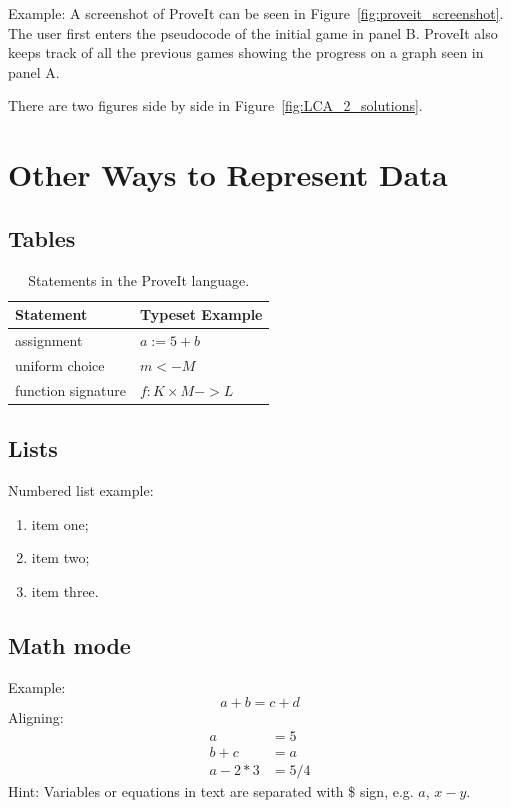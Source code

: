 \documentclass[estonian,english]{unitartucs-thesis} %
\newcommand{\proveit}{ProveIt\xspace}
\begin{document}
Example: A screenshot of \proveit can be seen in Figure~\ref{fig:proveit_screenshot}. The user first enters the pseudocode of the initial game in panel B. \proveit also keeps track of all the previous games showing the progress on a graph seen in panel A.

There are two figures side by side in Figure~\ref{fig:LCA_2_solutions}.



\clearpage %
\section{Other Ways to Represent Data}

\subsection{Tables}

\begin{table}[h]
\centering
\caption{Statements in the \proveit language.}
\begin{tabular}{| l | l |}
	\hline
	\bf{Statement} & \bf{Typeset Example} \\
	\hline
	assignment & $a := 5 + b$ \\
	\hline
	uniform choice & $m <- M$ \\
	\hline
	function signature & $f : K \times M -> L$\\
	\hline
\end{tabular}
\label{tab:statements}
\end{table}


\subsection{Lists}

Numbered list example:
\begin{enumerate}
	\item item one;
	\item item two;
	\item item three.
\end{enumerate}

\subsection{Math mode}
Example:
\begin{equation}
a + b = c + d
\end{equation}
Aligning:
\begin{align*}
	a &= 5 \\
	b + c &= a \\
	a -2*3 &= 5/4
\end{align*}
Hint: Variables or equations in text are separated with \$ sign, e.g. $a$, $x - y$.
\end{document}
